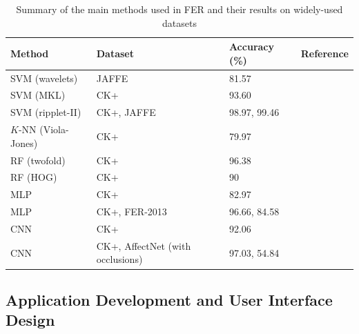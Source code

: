 \documentclass[12pt, a4paper]{article}
\begin{document}
\begin{table}[H]
    \centering
    \begin{tabular}{|L{3.5cm}|L{2.7cm}|L{3cm}|L{3.5cm}|}
        \hline
        \normalsize{\textbf{Method}} & \normalsize{\textbf{Dataset}} & \normalsize{\textbf{Accuracy (\%)}} & \normalsize{\textbf{Reference}}
        \vspace{0.5em}
        \\ \hline

        SVM (wavelets)    &   JAFFE    &   81.57   &  \cite{kazmi2012wavelets}  \\ \hline
        SVM (MKL)    &   CK+    &   93.60   &  \cite{zhang2015facial}  \\ \hline
        SVM (ripplet-II)   &   CK+, JAFFE    &   98.97, 99.46   &  \cite{kar2019face}  \\ \hline
        $K$-NN (Viola-Jones)    &   CK+    &   79.97   &  \cite{dino2019facial}  \\ \hline
        RF (twofold)    &   CK+    &   96.38   &  \cite{pu2015facial}  \\ \hline
        RF (HOG)   &   CK+    &   90   &  \cite{munasinghe2018facial}  \\ \hline
        MLP    &   CK+    &   82.97  &  \cite{dino2019facial}  \\ \hline
        MLP    &   CK+, FER-2013    &   96.66, 84.58   &  \cite{boughrara2016facial}  \\ \hline
        CNN    &   CK+    &   92.06   &  \cite{xie2017facial}  \\ \hline
        CNN    &   CK+, AffectNet (with occlusions)    &   97.03, 54.84   &  \cite{li2018occlusion}  \\ \hline

    \end{tabular}
    \caption{Summary of the main methods used in FER and their results on widely-used datasets}
    \label{tab:fersummary}
\end{table}






\subsection{Application Development and User Interface Design}
\label{adduid}
\end{document}
